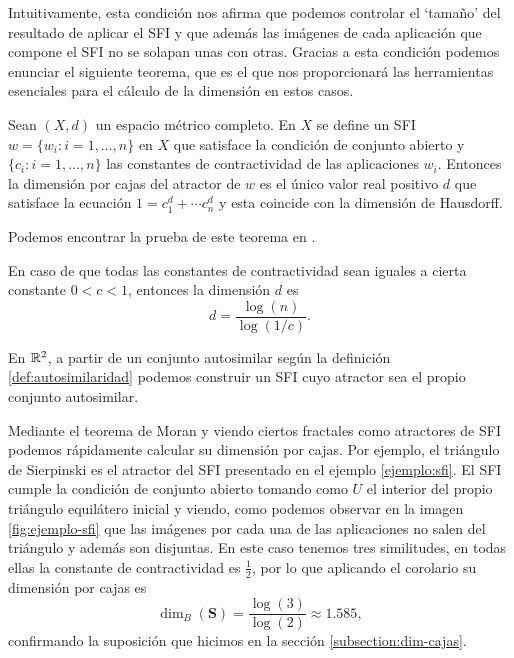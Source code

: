 Intuitivamente, esta condición nos afirma que podemos controlar el `tamaño' del resultado de aplicar el SFI y que además las imágenes de cada aplicación que compone el SFI no se solapan unas con otras. Gracias a esta condición podemos enunciar el siguiente teorema, que es el que nos proporcionará las herramientas esenciales para el cálculo de la dimensión en estos casos.

\begin{teorema}[Moran]
    \label{th:Moran}
    Sean $(X,d)$ un espacio métrico completo. En $X$ se define un SFI $w=\{w_i:i=1,\dots,n\}$ en $X$ que satisface la condición de conjunto abierto y $\{c_i:i=1,\dots,n\}$ las constantes de contractividad de las aplicaciones $w_i$. Entonces la dimensión por cajas del atractor de $w$ es el único valor real positivo $d$ que satisface la ecuación $1 = c_1^d + \cdots c_n^d$ y esta coincide con la dimensión de Hausdorff.
\end{teorema}

Podemos encontrar la prueba de este teorema en \cite{Moran}.

\begin{corolario}
    En caso de que todas las constantes de contractividad sean iguales a cierta constante $0<c<1$, entonces la dimensión $d$ es
    $$
    d = \dfrac{\log(n)}{\log(1/c)}.
    $$
\end{corolario}

\begin{observacion}
    En $\mathbb{R}^2$, a partir de un conjunto autosimilar según la definición \ref{def:autosimilaridad} podemos construir un SFI cuyo atractor sea el propio conjunto autosimilar.
\end{observacion}

Mediante el teorema de Moran y viendo ciertos fractales como atractores de SFI podemos rápidamente calcular su dimensión por cajas. Por ejemplo, el triángulo de Sierpinski es el atractor del SFI presentado en el ejemplo \ref{ejemplo:sfi}. El SFI cumple la condición de conjunto abierto tomando como $U$ el interior del propio triángulo equilátero inicial y viendo, como podemos observar en la imagen \ref{fig:ejemplo-sfi} que las imágenes por cada una de las aplicaciones no salen del triángulo y además son disjuntas.  En este caso tenemos tres similitudes, en todas ellas la constante de contractividad es $\frac{1}{2}$, por lo que aplicando el corolario su dimensión por cajas es 
$$\dim_B(\mathbf{S})=\frac{\log(3)}{\log(2)}\approx 1.585,$$
confirmando la suposición que hicimos en la sección \ref{subsection:dim-cajas}.

